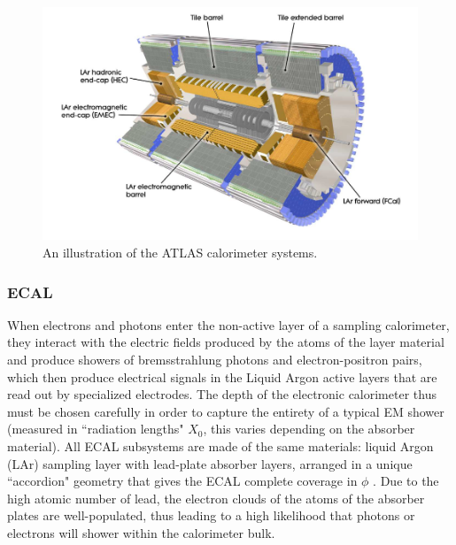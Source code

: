 \begin{figure}
  \includegraphics[width=\linewidth]{figures/detector_chapter/Calos.png}
  \caption{An illustration of the ATLAS calorimeter systems. \cite{ATLAS_Jinst}}
  \label{fig:Calos}
\end{figure}


\subsubsection{ECAL} \label{sec:ECAL} 

When electrons and photons enter the non-active layer of a sampling calorimeter, they interact with the electric fields produced by the atoms of the layer material and produce showers of bremsstrahlung photons and electron-positron pairs, which then produce electrical signals in the Liquid Argon active layers that are read out by specialized electrodes. The depth of the electronic calorimeter thus must be chosen carefully in order to capture the entirety of a typical EM shower (measured in ``radiation lengths" $X_0$, this varies depending on the absorber material). All ECAL subsystems are made of the same materials: liquid Argon (LAr) sampling layer with lead-plate absorber layers, arranged in a unique ``accordion" geometry that gives the ECAL complete coverage in $\phi$ . Due to the high atomic number of lead, the electron clouds of the atoms of the absorber plates are well-populated, thus leading to a high likelihood that photons or electrons will shower within the calorimeter bulk.

